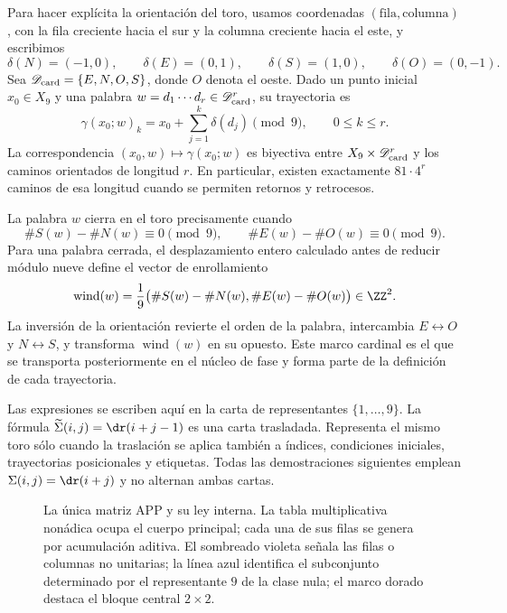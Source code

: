 Para hacer explícita la orientación del toro, usamos coordenadas
\((\text{fila},\text{columna})\), con la fila creciente hacia el sur y la
columna creciente hacia el este, y escribimos
\[
 \delta(N)=(-1,0),\qquad \delta(E)=(0,1),\qquad
 \delta(S)=(1,0),\qquad \delta(O)=(0,-1).
\]
Sea \(\mathscr D_{\rm card}=\{E,N,O,S\}\), donde \(O\) denota el oeste. Dado un punto inicial
\(x_0\in X_9\) y una palabra \(w=d_1\cdots d_r\in
\mathscr D_{\rm card}^{r}\), su trayectoria es
\[
 \gamma(x_0;w)_k
 =x_0+\sum_{j=1}^{k}\delta(d_j)\pmod 9,
 \qquad 0\leq k\leq r.
\]
La correspondencia \((x_0,w)\mapsto\gamma(x_0;w)\) es biyectiva entre
\(X_9\times\mathscr D_{\rm card}^{r}\) y los caminos orientados de
longitud \(r\). En particular, existen exactamente \(81\cdot4^r\) caminos
de esa longitud cuando se permiten retornos y retrocesos.

La palabra \(w\) cierra en el toro precisamente cuando
\[
\#S(w)-\#N(w)\equiv0\pmod9,
\qquad
\#E(w)-\#O(w)\equiv0\pmod9.
\]
Para una palabra cerrada, el desplazamiento entero calculado antes de reducir
módulo nueve define el vector de enrollamiento
\[
 \operatorname{wind}(w)=\frac1{9}
 \bigl(\#S(w)-\#N(w),\#E(w)-\#O(w)\bigr)\in\ZZ^2.
\]
La inversión de la orientación revierte el orden de la palabra, intercambia
\(E\leftrightarrow O\) y \(N\leftrightarrow S\), y transforma
\(\operatorname{wind}(w)\) en su opuesto. Este marco cardinal es el que se
transporta posteriormente en el núcleo de fase y forma parte de la definición
de cada trayectoria.

Las expresiones se escriben aquí en la carta de representantes
\(\{1,\ldots,9\}\). La fórmula
\(\widetilde\Sigma(i,j)=\dr(i+j-1)\) es una carta trasladada. Representa el
mismo toro sólo cuando la traslación se aplica también a índices, condiciones
iniciales, trayectorias posicionales y etiquetas. Todas las demostraciones siguientes emplean
\(\Sigma(i,j)=\dr(i+j)\) y no alternan ambas cartas.

\begin{figure}[H]
\centering
\resizebox{\textwidth}{!}{}
\caption{La única matriz APP y su ley interna. La tabla multiplicativa
nonádica ocupa el cuerpo principal; cada una de sus filas se genera por
acumulación aditiva. El sombreado violeta señala las filas o columnas no
unitarias; la línea azul identifica el subconjunto determinado por el
representante \(9\) de la clase nula; el marco dorado destaca el bloque
central \(2\times2\).}
\label{fig:app-ortograma}
\end{figure}

